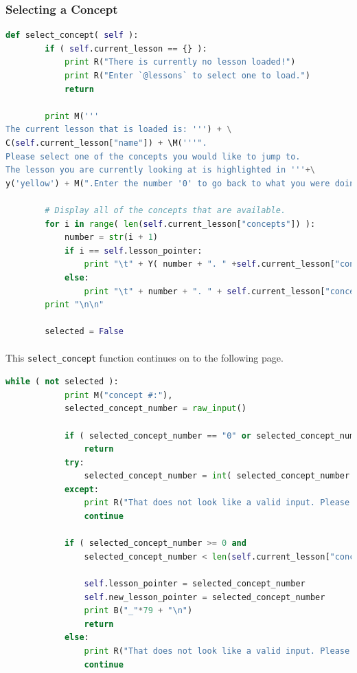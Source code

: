 \documentclass[11pt]{article}
\begin{document}
	\newpage 

	\subsubsection{Selecting a Concept}

	\begin{lstlisting}[language=Python]
	def select_concept( self ):
		if ( self.current_lesson == {} ):
			print R("There is currently no lesson loaded!")
			print R("Enter `@lessons` to select one to load.")
			return 

		print M('''
The current lesson that is loaded is: ''') + \
C(self.current_lesson["name"]) + \M('''".
Please select one of the concepts you would like to jump to.
The lesson you are currently looking at is highlighted in '''+\
y('yellow') + M(".Enter the number '0' to go back to what you were doing.\n"))

		# Display all of the concepts that are available.
		for i in range( len(self.current_lesson["concepts"]) ):
			number = str(i + 1)
			if i == self.lesson_pointer:
				print "\t" + Y( number + ". " +self.current_lesson["concepts"][i]["tag"])
			else:
				print "\t" + number + ". " + self.current_lesson["concepts"][i]["tag"]
		print "\n\n"
		
		selected = False	
	\end{lstlisting}	

	\paragraph{}

	\paragraph{} This \texttt{select\_concept} function continues on to the following page.

	\newpage

	\begin{lstlisting}[language=Python]
		while ( not selected ):
			print M("concept #:"),
			selected_concept_number = raw_input()

			if ( selected_concept_number == "0" or selected_concept_number == "quit" ):
				return
			try:
				selected_concept_number = int( selected_concept_number ) - 1
			except:
				print R("That does not look like a valid input. Please try again.")
				continue

			if ( selected_concept_number >= 0 and 
				selected_concept_number < len(self.current_lesson["concepts"]) ):

				self.lesson_pointer = selected_concept_number
				self.new_lesson_pointer = selected_concept_number
				print B("_"*79 + "\n")
				return
			else:
				print R("That does not look like a valid input. Please try again.")
				continue
	\end{lstlisting}
\end{document}
